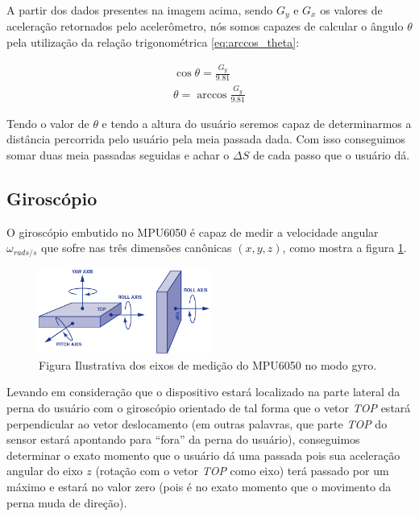 \documentclass{article}
\newcommand{\n}{\nonumber \\ }
\begin{document}
   
            A partir dos dados presentes na imagem acima, sendo $G_y$ e $G_x$ os valores de aceleração
            retornados pelo acelerômetro, nós somos capazes de calcular o ângulo $\theta$ pela utilização da
             relação trigonométrica \ref{eq:arccos_theta}:

            \begin{align}
                \cos{\theta} = \frac{G_y}{9.81} \n 
                \theta = \arccos{\frac{G_y}{9.81}} \label{eq:arccos_theta}
            \end{align}

            Tendo o valor de $\theta$ e tendo a altura do usuário seremos capaz de determinarmos a distância
            percorrida pelo usuário pela meia passada dada. Com isso conseguimos somar duas meia passadas
            seguidas e achar o $\Delta S$ de cada passo que o usuário dá.

        \subsection*{Giroscópio}
            O giroscópio embutido no MPU6050 é capaz de medir a velocidade angular $\omega_{rads/s}$ que sofre nas três
            dimensões canônicas $(x,y,z)$, como mostra a figura \ref{fig:gyro}.

            \begin{figure}[h!]
                \vspace{10px}
                \centering
                \includegraphics[width=0.5\textwidth]{img/Gyro-Fig-01.png}
                \caption{Figura Ilustrativa dos eixos de medição do MPU6050 no modo gyro.}
                \label{fig:gyro}
            \end{figure}
            
            Levando em consideração que o dispositivo estará localizado na parte lateral da perna do usuário
            com o giroscópio orientado de tal forma que o vetor \textit{TOP} estará perpendicular ao vetor
            deslocamento (em outras palavras, que parte \textit{TOP} do sensor estará apontando para ``fora''
            da perna do usuário), conseguimos determinar o exato momento que o usuário dá uma passada pois sua
            aceleração angular do eixo $z$ (rotação com o vetor \textit{TOP} como eixo) terá passado por um
            máximo e estará no valor zero (pois é no exato momento que o movimento da perna muda de direção).
            
\end{document}
